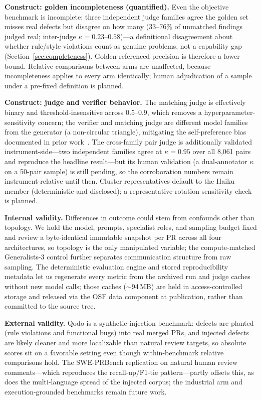 \documentclass[conference]{IEEEtran}
\begin{document}
\textbf{Construct: golden incompleteness (quantified).} Even the objective
benchmark is incomplete: three independent judge families agree the golden
set misses real defects but disagree on how many (33--76\% of unmatched
findings judged real; inter-judge $\kappa{=}0.23$--$0.58$)---a
definitional disagreement about whether rule/style violations count as
genuine problems, not a capability gap
(Section~\ref{sec:completeness}). Golden-referenced precision is therefore
a lower bound. Relative comparisons between arms are unaffected, because
incompleteness applies to every arm identically; human adjudication of a
sample under a pre-fixed definition is planned.

\textbf{Construct: judge and verifier behavior.} The matching judge is
effectively binary and threshold-insensitive across 0.5--0.9, which removes
a hyperparameter-sensitivity concern; the verifier and matching judge are
different model families from the generator (a non-circular triangle),
mitigating the self-preference bias documented in prior
work~\cite{panickssery}. The cross-family pair judge is additionally
validated instrument-side---two independent families agree at
$\kappa{=}0.95$ over all 8{,}061 pairs and reproduce the headline
result---but its human validation (a dual-annotator $\kappa$ on a 50-pair
sample) is still pending, so the corroboration numbers remain
instrument-relative until then. Cluster representatives default to the
Haiku member (deterministic and disclosed); a representative-rotation
sensitivity check is planned.

\textbf{Internal validity.} Differences in outcome could stem from confounds
other than topology. We hold the model, prompts, specialist roles, and
sampling budget fixed and review a byte-identical immutable snapshot per PR
across all four architectures, so topology is the only manipulated variable;
the compute-matched Generalists-3 control further separates communication
structure from raw sampling. The deterministic evaluation engine and stored
reproducibility metadata let us regenerate every metric from the archived run
and judge caches without new model calls; those caches ($\sim$94\,MB) are held
in access-controlled storage and released via the OSF data component at
publication, rather than committed to the source tree.

\textbf{External validity.} Qodo is a synthetic-injection benchmark:
defects are planted (rule violations and functional bugs) into real merged
PRs, and injected defects are likely cleaner and more localizable than
natural review targets, so absolute scores sit on a favorable setting even
though within-benchmark relative comparisons hold. The SWE-PRBench
replication on natural human review comments---which reproduces the
recall-up/F1-tie pattern---partly offsets this, as does the multi-language
spread of the injected corpus; the industrial arm and execution-grounded
benchmarks remain future work.
\end{document}
